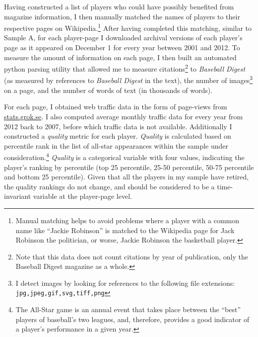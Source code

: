 \documentclass[11pt]{article}
\begin{document}

Having constructed a list of players who could have possibly benefited from magazine information, I then manually matched the names of players to their respective pages on Wikipedia.\footnote{Manual matching helps to avoid problems where a player with a common name like ``Jackie Robinson'' is matched to the Wikipedia page for Jack Robinson the politician, or worse, Jackie Robinson the basketball player.} After having completed this matching, similar to Sample A, for each player-page I downloaded archival versions of each player's page as it appeared on December 1 for every year between 2001 and 2012. To measure the amount of information on each page, I then built an automated python parsing utility that allowed me to measure citations\footnote{Note that this data does not count citations by year of publication, only the Baseball Digest magazine as a whole.} to \emph{Baseball Digest} (as measured by references to \emph{Baseball Digest} in the text), the number of images\footnote{I detect images by looking for references to the following file extensions: \texttt{jpg,jpeg,gif,svg,tiff,png}} on a page, and the number of words of text (in thousands of words).

For each page, I obtained web traffic data in the form of page-views from \url{stats.grok.se}. I also computed average monthly traffic data for every year from 2012 back to 2007, before which traffic data is not available. Additionally I constructed a \emph{quality} metric for each player. \emph{Quality} is calculated based on percentile rank in the list of all-star appearances within the sample under consideration.\footnote{The All-Star game is an annual event that takes place between the ``best'' players of baseball's two leagues, and, therefore, provides a good indicator of a player's performance in a given year.} \emph{Quality} is a categorical variable with four values, indicating the player's ranking by percentile (top 25 percentile, 25-50 percentile, 50-75 percentile and bottom 25 percentile). Given that all the players in my sample have retired, the quality rankings do not change, and should be considered to be a time-invariant variable at the player-page level. 

\end{document}
